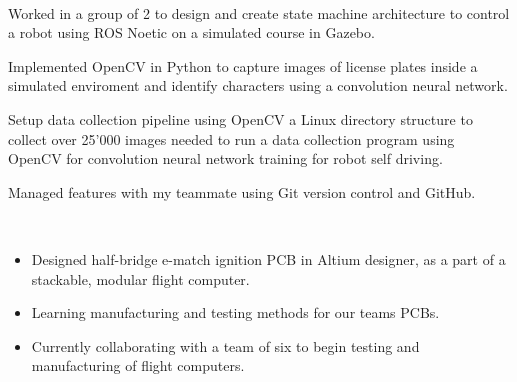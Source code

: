 \documentclass[a4paper]{MagicalCV}
\begin{document}
\begin{minipage}[t]{0.69\textwidth}
 \\
\begin{tightemize}
        \item Worked in a group of 2 to design and create state machine architecture to control a robot using ROS Noetic on a simulated course in Gazebo.
        \item Implemented OpenCV in Python to capture images of license plates inside a simulated enviroment and identify characters using a convolution neural network.
        \item Setup data collection pipeline using OpenCV a Linux directory structure to collect over 25'000 images needed to run a data collection program using OpenCV for convolution neural network training for robot self driving.
        \item Managed features with my teammate using Git version control and GitHub.
\end{tightemize}
\sectionsep

 \\
\begin{itemize}
    \item Designed half-bridge e-match ignition PCB in Altium designer, as a part of a stackable, modular flight computer.
    \item Learning manufacturing and testing methods for our teams PCBs.   
    \item Currently collaborating with a team of six to begin testing and manufacturing of flight computers.
\end{itemize} 
\sectionsep

\end{minipage} 
\end{document}
